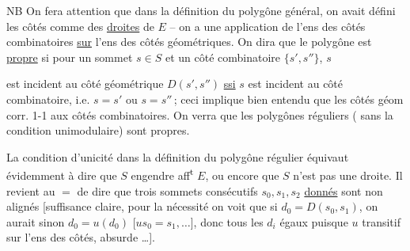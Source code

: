 NB \quad On fera attention que dans la définition
du polygône général, on avait défini
les côtés comme des \uline{droites} de $E$
-- on a une application  de
l'ens des côtés combinatoires \uline{sur} l'ens
des côtés géométriques. On dira
que le polygône est \uline{propre} si pour un sommet
$s\in S$ et un côté combinatoire $\{s',s''\}$, $s$

est incident au côté géométrique $D(s',s'')$
\uline{ssi} $s$ est incident au côté combinatoire, i.e.
$s=s'$ ou $s=s''$\,; ceci implique bien entendu
que les côtés géom corr. 1-1 aux côtés
combinatoires. On verra que les polygônes
réguliers ( sans la condition unimodulaire)
sont  propres.

La condition d'unicité dans la définition
du polygône régulier équivaut évidemment
à dire que $S$ engendre aff\textsuperscript{t} $E$, ou encore
que $S$ n'est pas   une droite. Il
revient au $=$  de dire que
trois sommets consécutifs $s_0,s_1,s_2$ \uline{donnés}
sont non alignés [suffisance claire, pour la
nécessité on voit que si $d_0=D(s_0,s_1)$, on aurait
sinon  $d_0=u(d_0)$ [$us_0=s_1,\ldots$], donc
tous les $d_i$ égaux puisque $u$ transitif
sur l'ens des côtés, absurde \ldots].


